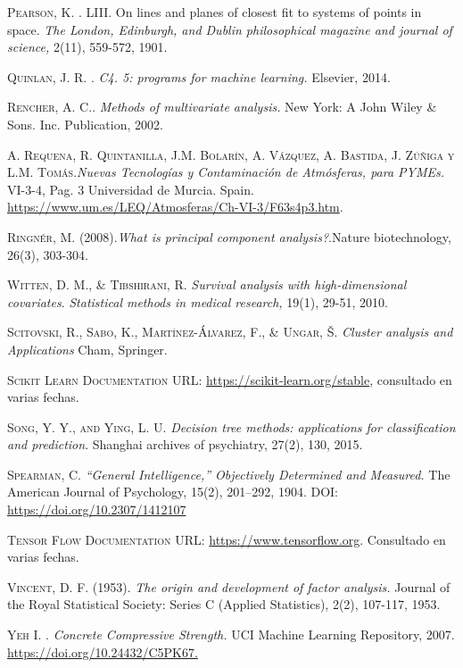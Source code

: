 \begin{thebibliography}{99}
 \textsc{Pearson, K. }. LIII. On lines and planes of closest fit to systems of points in space. \emph{The London, Edinburgh, and Dublin philosophical magazine and journal of science,} 2(11), 559-572, 1901.

\textsc{Quinlan, J. R. }. \emph{C4. 5: programs for machine learning.} Elsevier, 2014.

 \textsc{Rencher, A. C.}. \emph{Methods of multivariate analysis.} New York: A John Wiley \& Sons. Inc. Publication, 2002.

\textsc{A. Requena, R. Quintanilla, J.M. Bolarín, A. Vázquez, A. Bastida, J. Zúñiga y L.M. Tomás.}\emph{Nuevas Tecnologías y Contaminación de Atmósferas, para PYMEs.} VI-3-4, Pag. 3 Universidad de Murcia. Spain. \url{https://www.um.es/LEQ/Atmosferas/Ch-VI-3/F63s4p3.htm}.

\textsc{Ringnér, M. (2008).}\emph{What is principal component analysis?}.Nature biotechnology, 26(3), 303-304.

\textsc{Witten, D. M., \& Tibshirani, R. } \emph{Survival analysis with high-dimensional covariates}. \emph{Statistical methods in medical research,} 19(1), 29-51, 2010.

\textsc{Scitovski, R., Sabo, K., Martínez-Álvarez, F., \& Ungar, Š. } \emph{Cluster analysis and Applications} Cham, Springer.

 \textsc{Scikit Learn Documentation} URL: \url{https://scikit-learn.org/stable}, consultado en varias fechas. 

\textsc{Song, Y. Y., and Ying, L. U. } \emph{Decision tree methods: applications for classification and prediction}. Shanghai archives of psychiatry, 27(2), 130, 2015.

\textsc{Spearman, C.} \emph{“General Intelligence,” Objectively Determined and Measured.} The American Journal of Psychology, 15(2), 201–292, 1904. DOI: \url{https://doi.org/10.2307/1412107}

\textsc{Tensor Flow Documentation} URL: \url{https://www.tensorflow.org}. Consultado en varias fechas.

\textsc{Vincent, D. F. (1953).} \emph{The origin and development of factor analysis.} Journal of the Royal Statistical Society: Series C (Applied Statistics), 2(2), 107-117, 1953.



\textsc{Yeh I. }. \emph{Concrete Compressive Strength.} UCI Machine Learning Repository, 2007. \url{https://doi.org/10.24432/C5PK67.}

\end{thebibliography}
 